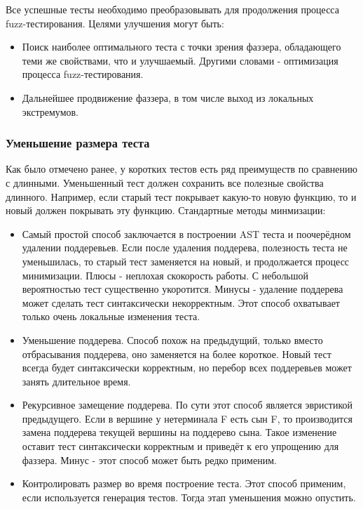 \documentclass[a4paper]{article}
\begin{document}
Все успешные тесты необходимо преобразовывать для продолжения процесса fuzz-тестирования. Целями улучшения могут быть: 
\begin{itemize}
\item Поиск наиболее оптимального теста с точки зрения фаззера, обладающего теми же свойствами, что и улучшаемый. Другими словами - оптимизация процесса fuzz-тестирования.
\item Дальнейшее продвижение фаззера, в том числе выход из локальных экстремумов.
\end{itemize}

\subsubsection{Уменьшение размера теста}
\indent

Как было отмечено ранее, у коротких тестов есть ряд преимуществ по сравнению с длинными. Уменьшенный тест должен сохранить все полезные свойства длинного. Например, если старый тест покрывает какую-то новую функцию, то и новый должен покрывать эту функцию. Стандартные методы минмизации:

\begin{itemize}
\item Самый простой способ заключается в построении AST теста и поочерёдном удалении поддеревьев\cite{litlink6}. Если после удаления поддерева, полезность теста не уменьшилась, то старый тест заменяется на новый, и продолжается процесс минимизации. Плюсы - неплохая скокорость работы. С небольшой вероятностью тест  существенно укоротится. Минусы - удаление поддерева может сделать тест синтаксически некорректным. Этот способ охватывает только очень локальные изменения теста.
\item Уменьшение поддерева\cite{litlink3}. Способ похож на предыдущий, только вместо отбрасывания поддерева, оно заменяется на более короткое. Новый тест всегда будет синтаксически корректным, но перебор всех поддеревьев может занять длительное время.
\item Рекурсивное замещение поддерева\cite{litlink6}. По сути этот способ является эвристикой предыдущего. Если в вершине у нетерминала F есть сын F, то производится замена поддерева текущей вершины на поддерево сына. Такое изменение оставит тест синтаксически корректным и приведёт к его упрощению для фаззера. Минус - этот способ может быть редко применим.
\item Контролировать размер во время построение теста\cite{litlink5}. Этот способ применим, если используется генерация тестов. Тогда этап уменьшения можно опустить.
\end{itemize}
\end{document}
